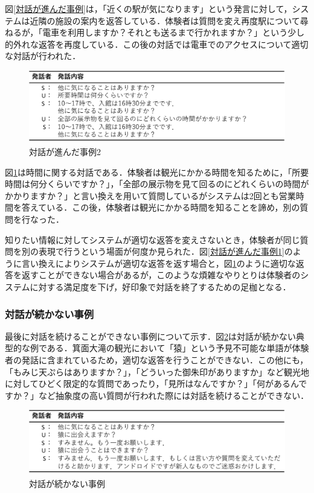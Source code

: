 図\ref{対話が進んだ事例}は，「近くの駅が気になります」という発言に対して，システムは近隣の施設の案内を返答している．体験者は質問を変え再度駅について尋ねるが，「電車を利用しますか？それとも送るまで行かれますか？」という少し的外れな返答を再度している．この後の対話では電車でのアクセスについて適切な対話が行われた．

\begin{figure}[th]
    \centering
    \includegraphics[scale=0.5]{pic/example12.pdf}
    \caption{対話が進んだ事例2}
    \label{対話が進んだ事例2}
\end{figure}

図\ref{対話が進んだ事例2}は時間に関する対話である．体験者は観光にかかる時間を知るために，「所要時間は何分くらいですか？」，「全部の展示物を見て回るのにどれくらいの時間がかかりますか？」と言い換えを用いて質問しているがシステムは2回とも営業時間を答えている．この後，体験者は観光にかかる時間を知ることを諦め，別の質問を行なった．

知りたい情報に対してシステムが適切な返答を変えさないとき，体験者が同じ質問を別の表現で行うという場面が何度か見られた．図\ref{対話が進んだ事例1}のように言い換えによりシステムが適切な返答を返す場合と，図\ref{対話が進んだ事例2}のように適切な返答を返すことができない場合があるが，このような煩雑なやりとりは体験者のシステムに対する満足度を下げ，好印象で対話を終了するための足枷となる．

\subsubsection*{対話が続かない事例}
最後に対話を続けることができない事例について示す．図\ref{対話が続かない事例}は対話が続かない典型的な例である．箕面大滝の観光において「猿」という予見不可能な単語が体験者の発話に含まれているため，適切な返答を行うことができない．この他にも，「もみじ天ぷらはありますか？」，「どういった御朱印がありますか」など観光地に対してひどく限定的な質問であったり，「見所はなんですか？」「何があるんですか？」など抽象度の高い質問が行われた際には対話を続けることができない．

\begin{figure}[th]
    \centering
    \includegraphics[scale=0.5]{pic/example21.pdf}
    \caption{対話が続かない事例}
    \label{対話が続かない事例}
\end{figure}


